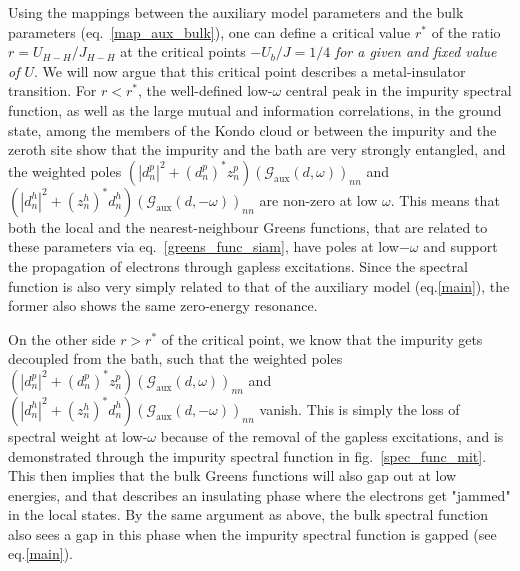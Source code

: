 \documentclass{report}
\numberwithin{equation}{section}
\begin{document}
\begin{itemize}
Using the mappings between the auxiliary model parameters and the bulk parameters (eq.~\ref{map_aux_bulk}), one can define a critical value \(r^{*}\) of the ratio \(r = U_{H-H}/J_{H-H}\) at the critical points \(-U_b/J=1/4\) \textit{for a given and fixed value of \(U\)}. We will now argue that this critical point describes a metal-insulator transition. For \(r < r^{*}\), the well-defined low-\(\omega\) central peak in the impurity spectral function, as well as the large mutual and information correlations, in the ground state, among the members of the Kondo cloud or between the impurity and the zeroth site show that the impurity and the bath are very strongly entangled, and the weighted poles \(\left(|d^p_n|^2 + \left(d^p_n\right)^* z^p_n\right) \left(\mathcal{G}_\text{aux}(d, \omega)\right)_{nn}\) and \(\left(|d^h_n|^2 + \left(z^h_n\right)^* d^h_n\right)\left(\mathcal{G}_\text{aux}(d, -\omega)\right)_{nn}\) are non-zero at low \(\omega\). This means that both the local and the nearest-neighbour Greens functions, that are related to these parameters via eq.~\ref{greens_func_siam}, have poles at low\(-\omega\) and support the propagation of electrons through gapless excitations. Since the spectral function is also very simply related to that of the auxiliary model (eq.\eqref{main}), the former also shows the same zero-energy resonance.

On the other side \(r > r^{*}\) of the critical point, we know that the impurity gets decoupled from the bath, such that the weighted poles \(\left(|d^p_n|^2 + \left(d^p_n\right)^* z^p_n\right) \left(\mathcal{G}_\text{aux}(d, \omega)\right)_{nn}\) and \(\left(|d^h_n|^2 + \left(z^h_n\right)^* d^h_n\right)\left(\mathcal{G}_\text{aux}(d, -\omega)\right)_{nn}\) vanish. This is simply the loss of spectral weight at low-\(\omega\) because of the removal of the gapless excitations, and is demonstrated through the impurity spectral function in fig.~\ref{spec_func_mit}. This then implies that the bulk Greens functions will also gap out at low energies, and that describes an insulating phase where the electrons get "jammed" in the local states. By the same argument as above, the bulk spectral function also sees a gap in this phase when the impurity spectral function is gapped (see eq.\eqref{main}).


\end{itemize}
\end{document}
